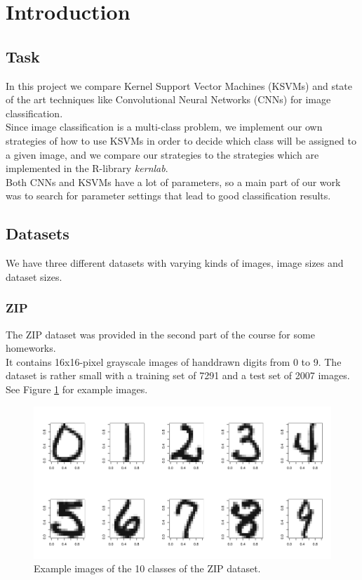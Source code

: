 
\section{Introduction}

\subsection{Task}

In this project we compare Kernel Support Vector Machines (KSVMs) and state of the art techniques
like Convolutional Neural Networks (CNNs) for image classification.\\
Since image classification is a multi-class problem,
we implement our own strategies of how to use KSVMs in order to decide which class
will be assigned to a given image, and we compare our strategies to the strategies
which are implemented in the R-library \textit{kernlab}.\\
Both CNNs and KSVMs have a lot of parameters, so a main part of our work
was to search for parameter settings that lead to good classification results.


\subsection{Datasets}

We have three different datasets with varying kinds of images, image sizes and dataset sizes.


\subsubsection{ZIP}

The ZIP dataset was provided in the second part of the course for some homeworks.\\
It contains 16x16-pixel grayscale images of handdrawn digits from 0 to 9.
The dataset is rather small with a training set of 7291 and a test set of 2007 images.
See Figure \ref{zip_dataset} for example images.

\begin{figure}
 \includegraphics[width=\textwidth]{../plots/zip_dataset}
 \caption{Example images of the 10 classes of the ZIP dataset.}
 \label{zip_dataset}
\end{figure}


